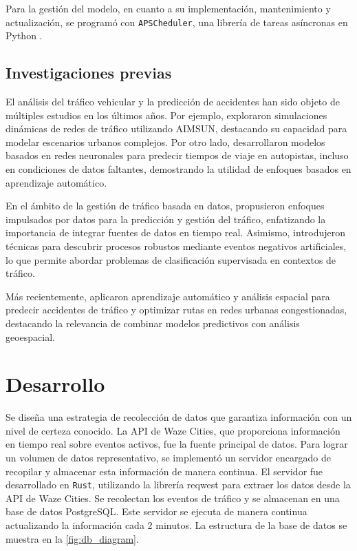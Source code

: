 \documentclass[12pt]{article}
\begin{document}
Para la gestión del modelo, en cuanto a su implementación, mantenimiento y actualización, se programó con \texttt{APSCheduler}, una librería de tareas asíncronas en Python \parencite{apscheduler2025}.

\subsection{Investigaciones previas}

El análisis del tráfico vehicular y la predicción de accidentes han sido objeto de múltiples estudios en los últimos años. Por ejemplo, \parencite{barcelo2005} exploraron simulaciones dinámicas de redes de tráfico utilizando AIMSUN, destacando su capacidad para modelar escenarios urbanos complejos. Por otro lado, \parencite{vanlint2005} desarrollaron modelos basados en redes neuronales para predecir tiempos de viaje en autopistas, incluso en condiciones de datos faltantes, demostrando la utilidad de enfoques basados en aprendizaje automático.

En el ámbito de la gestión de tráfico basada en datos, \parencite{chen2015} propusieron enfoques impulsados por datos para la predicción y gestión del tráfico, enfatizando la importancia de integrar fuentes de datos en tiempo real. Asimismo, \parencite{goedertier2009robust} introdujeron técnicas para descubrir procesos robustos mediante eventos negativos artificiales, lo que permite abordar problemas de clasificación supervisada en contextos de tráfico.

Más recientemente, \parencite{berhanu2024} aplicaron aprendizaje automático y análisis espacial para predecir accidentes de tráfico y optimizar rutas en redes urbanas congestionadas, destacando la relevancia de combinar modelos predictivos con análisis geoespacial.

\section{Desarrollo}

Se diseña una estrategia de recolección de datos que garantiza información con un nivel de certeza conocido. La API de Waze Cities, que proporciona información en tiempo real sobre eventos activos, fue la fuente principal de datos. Para lograr un volumen de datos representativo, se implementó un servidor encargado de recopilar y almacenar esta información de manera continua. El servidor fue desarrollado en \texttt{Rust}, utilizando la librería reqwest \parencite{reqwest2025} para extraer los datos desde la API de Waze Cities. Se recolectan los eventos de tráfico y se almacenan en una base de datos PostgreSQL. Este servidor se ejecuta de manera continua actualizando la información cada 2 minutos. La estructura de la base de datos se muestra en la \autoref{fig:db_diagram}.
\end{document}
